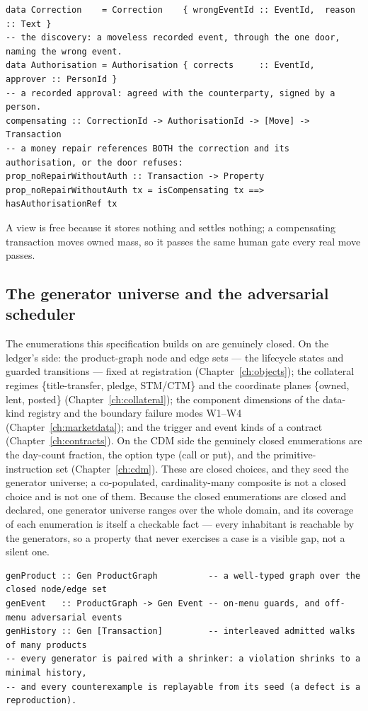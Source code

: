\begin{lstlisting}
data Correction    = Correction    { wrongEventId :: EventId,  reason   :: Text }
-- the discovery: a moveless recorded event, through the one door, naming the wrong event.
data Authorisation = Authorisation { corrects     :: EventId,  approver :: PersonId }
-- a recorded approval: agreed with the counterparty, signed by a person.
compensating :: CorrectionId -> AuthorisationId -> [Move] -> Transaction
-- a money repair references BOTH the correction and its authorisation, or the door refuses:
prop_noRepairWithoutAuth :: Transaction -> Property
prop_noRepairWithoutAuth tx = isCompensating tx ==> hasAuthorisationRef tx
\end{lstlisting}

A view is free because it stores nothing and settles nothing; a compensating transaction
moves owned mass, so it passes the same human gate every real move passes.

\subsection{The generator universe and the adversarial scheduler}

The enumerations this specification builds on are genuinely closed. On the ledger's side:
the product-graph node and edge sets --- the lifecycle states and guarded transitions ---
fixed at registration (Chapter~\ref{ch:objects}); the collateral regimes
\{title-transfer, pledge, STM/CTM\} and the coordinate planes \{owned, lent, posted\}
(Chapter~\ref{ch:collateral}); the component dimensions of the data-kind registry and the
boundary failure modes W1--W4 (Chapter~\ref{ch:marketdata}); and the trigger and event
kinds of a contract (Chapter~\ref{ch:contracts}). On the CDM side the genuinely closed
enumerations are the day-count fraction, the option type (call or put), and the
primitive-instruction set (Chapter~\ref{ch:cdm}). These are closed choices, and they seed
the generator universe; a co-populated, cardinality-many composite is not a closed choice
and is not one of them. Because the closed enumerations are closed and declared, one
generator universe ranges over the whole domain, and its coverage of each enumeration is
itself a checkable fact --- every inhabitant is reachable by the generators, so a property
that never exercises a case is a visible gap, not a silent one.

\begin{lstlisting}
genProduct :: Gen ProductGraph          -- a well-typed graph over the closed node/edge set
genEvent   :: ProductGraph -> Gen Event -- on-menu guards, and off-menu adversarial events
genHistory :: Gen [Transaction]         -- interleaved admitted walks of many products
-- every generator is paired with a shrinker: a violation shrinks to a minimal history,
-- and every counterexample is replayable from its seed (a defect is a reproduction).
\end{lstlisting}

